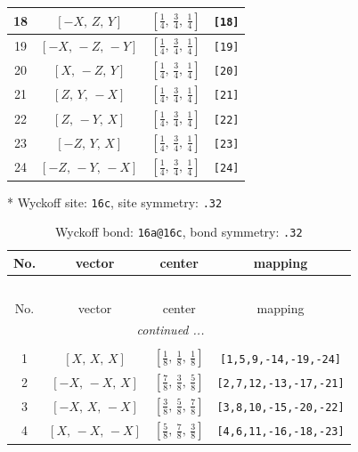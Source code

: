 \documentclass[fleqn,8pt]{jsarticle}
\begin{document}
\begin{longtable}{cccc}
18 & $\left[ - X,\, Z,\, Y \right]$ & $\left[ \frac{1}{4},\, \frac{3}{4},\, \frac{1}{4} \right]$ & {\tt [18]} \\ \hline
19 & $\left[ - X,\, - Z,\, - Y \right]$ & $\left[ \frac{1}{4},\, \frac{3}{4},\, \frac{1}{4} \right]$ & {\tt [19]} \\ \hline
20 & $\left[ X,\, - Z,\, Y \right]$ & $\left[ \frac{1}{4},\, \frac{3}{4},\, \frac{1}{4} \right]$ & {\tt [20]} \\ \hline
21 & $\left[ Z,\, Y,\, - X \right]$ & $\left[ \frac{1}{4},\, \frac{3}{4},\, \frac{1}{4} \right]$ & {\tt [21]} \\ \hline
22 & $\left[ Z,\, - Y,\, X \right]$ & $\left[ \frac{1}{4},\, \frac{3}{4},\, \frac{1}{4} \right]$ & {\tt [22]} \\ \hline
23 & $\left[ - Z,\, Y,\, X \right]$ & $\left[ \frac{1}{4},\, \frac{3}{4},\, \frac{1}{4} \right]$ & {\tt [23]} \\ \hline
24 & $\left[ - Z,\, - Y,\, - X \right]$ & $\left[ \frac{1}{4},\, \frac{3}{4},\, \frac{1}{4} \right]$ & {\tt [24]} \\
\end{longtable}
* Wyckoff site: {\tt 16c}, site symmetry: {\tt .32}
\renewcommand{\arraystretch}{1.2}
\begin{longtable}{cccc}
\caption{Wyckoff bond: {\tt 16a@16c}, bond symmetry: {\tt .32}}
 \\
 \hline \hline
No. & vector & center & mapping \\ \hline \endfirsthead

\multicolumn{3}{l}{\tablename\ \thetable{}} \\
 \hline \hline
No. & vector & center & mapping \\ \hline \endhead

 \hline \hline
\multicolumn{3}{r}{\footnotesize\it continued ...} \\ \endfoot

 \hline \hline
\multicolumn{3}{r}{} \\ \endlastfoot

1 & $\left[ X,\, X,\, X \right]$ & $\left[ \frac{1}{8},\, \frac{1}{8},\, \frac{1}{8} \right]$ & {\tt [1,5,9,-14,-19,-24]} \\ \hline
2 & $\left[ - X,\, - X,\, X \right]$ & $\left[ \frac{7}{8},\, \frac{3}{8},\, \frac{5}{8} \right]$ & {\tt [2,7,12,-13,-17,-21]} \\ \hline
3 & $\left[ - X,\, X,\, - X \right]$ & $\left[ \frac{3}{8},\, \frac{5}{8},\, \frac{7}{8} \right]$ & {\tt [3,8,10,-15,-20,-22]} \\ \hline
4 & $\left[ X,\, - X,\, - X \right]$ & $\left[ \frac{5}{8},\, \frac{7}{8},\, \frac{3}{8} \right]$ & {\tt [4,6,11,-16,-18,-23]} \\
\end{longtable}
\end{document}
